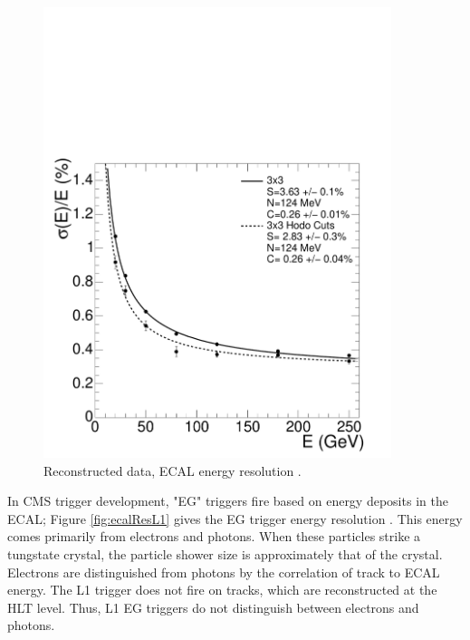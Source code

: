 \begin{figure}[]
\begin{centering}
\includegraphics[width=4in]{Chapter3/importfigs/Figure_001-007.pdf}
\par\end{centering}
\caption{Reconstructed data, ECAL energy resolution \cite{Bayatian:2006nff}. \label{fig:ecalRes}}
\end{figure}
 
In CMS trigger development, "EG" triggers fire based on energy deposits in the ECAL; Figure \ref{fig:ecalResL1} gives the EG trigger energy resolution \cite{Bayatian:2006nff}. This energy comes primarily from electrons and photons. When these particles strike a tungstate crystal, the particle shower size is approximately that of the crystal. Electrons are distinguished from photons by the correlation of track to ECAL energy. The L1 trigger does not fire on tracks, which are reconstructed at the HLT level. Thus, L1 EG triggers do not distinguish between electrons and photons. 

